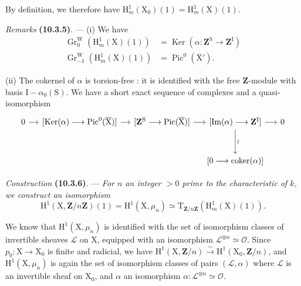 \documentclass[11pt,leqno]{article}
\begin{document}
By definition, we therefore have \(\mathrm{H}^{1}_{m}(\mathrm{X}_0)(1)=\mathrm{H}^{1}_{m}(\mathrm{X})(1)\).

\textit{Remarks} \textbf{(10.3.5)}. — (i) We have
\[
\begin{aligned}
\operatorname{Gr}^{\mathrm{W}}_0(\mathrm{H}^{1}_{m}(\mathrm{X})(1))
  &=\operatorname{Ker}(\alpha:\mathbf{Z}^{\mathrm{S}}\to\mathbf{Z}^{\mathrm{I}})\\
\operatorname{Gr}^{\mathrm{W}}_{-1}(\mathrm{H}^{1}_{m}(\mathrm{X})(1))
  &=\operatorname{Pic}^{0}(\overline{\mathrm{X}}').
\end{aligned}
\]

(ii) The cokernel of \(\alpha\) is torsion-free : it is identified with the free \(\mathbf{Z}\)-module with basis \(\mathrm{I}-\alpha_0(\mathrm{S})\). We have a short exact sequence of complexes and a quasi-isomorphism
\[
\begin{tikzcd}[column sep=small,row sep=3em]
0 \arrow[r]
 & {[\operatorname{Ker}(\alpha)\longrightarrow
       \operatorname{Pic}^{0}(\overline{\mathrm{X}})]} \arrow[r]
 & {[\mathbf{Z}^{\mathrm{S}}\longrightarrow
       \operatorname{Pic}(\overline{\mathrm{X}})]} \arrow[r]
 & {[\operatorname{Im}(\alpha)\longrightarrow\mathbf{Z}^{\mathrm{I}}]}
       \arrow[r] \arrow[d,"\wr"]
 & 0 \\
 & & & {[0\longrightarrow\operatorname{coker}(\alpha)]} &
\end{tikzcd}
\]

\textit{Construction} \textbf{(10.3.6)}. — \textit{For \(n\) an integer \(>0\) prime to the characteristic of \(k\), we construct an isomorphism}
\[
\mathrm{H}^{1}(\mathrm{X},\mathbf{Z}/n\mathbf{Z})(1)
=\mathrm{H}^{1}(\mathrm{X},\mu_n)
\simeq
\mathrm{T}_{\mathbf{Z}/n\mathbf{Z}}(\mathrm{H}^{1}_{m}(\mathrm{X})(1)).
\]

We know that \(\mathrm{H}^{1}(\mathrm{X},\mu_n)\) is identified with the set of isomorphism classes of invertible sheaves \(\mathcal{L}\) on \(\mathrm{X}\), equipped with an isomorphism \(\mathcal{L}^{\otimes n}\simeq\mathcal{O}\). Since \(p_0:\mathrm{X}\to\mathrm{X}_0\)  is finite and radicial, we have \(\mathrm{H}^{1}(\mathrm{X},\mathbf{Z}/n)\xrightarrow{\sim}\mathrm{H}^{1}(\mathrm{X}_0,\mathbf{Z}/n)\), and \(\mathrm{H}^{1}(\mathrm{X},\mu_n)\) is again the set of isomorphism classes of pairs \((\mathcal{L},\alpha)\) where \(\mathcal{L}\) is an invertible sheaf on \(\mathrm{X}_0\), and \(\alpha\) an isomorphism \(\alpha:\mathcal{L}^{\otimes n}\simeq\mathcal{O}\).
\end{document}
